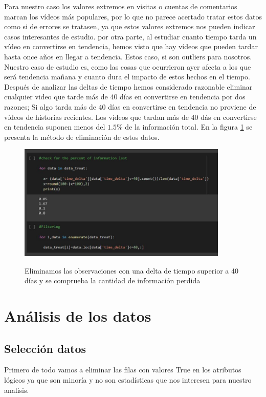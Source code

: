 \documentclass[a4paper,12pt]{article}
\begin{document}
Para nuestro caso los valores extremos en visitas o cuentas de comentarios marcan los v\'ideos m\'as populares, por lo que no parece acertado tratar estos datos como si de errores se tratasen, ya que estos valores extremos nos pueden indicar casos interesantes de estudio. por otra parte, al estudiar cuanto tiempo tarda un v\'ideo en convertirse  en tendencia, hemos visto que hay v\'ideos que pueden tardar hasta once a\~nos en llegar a tendencia. Estos caso, si son outliers  para nosotros. Nuestro caso de estudio es, como las cosas que ocurrieron ayer afecta a los que ser\'a tendencia ma\~nana y cuanto dura el impacto de estos hechos en el tiempo. Despu\'es de analizar las deltas de tiempo hemos considerado razonable eliminar cualquier video que tarde m\'as de 40 d\'ias en convertirse en tendencia por dos razones; Si algo tarda m\'as de 40 d\'ias en convertirse en tendencia no proviene de v\'ideos de historias recientes. Los v\'ideos que tardan m\'as de 40 d\'as en convertirse en tendencia suponen menos del $1.5\%$ de la informaci\'on total. En la figura \ref{fig:delta} se presenta la m\'etodo de eliminaci\'on de estos datos.

\begin{figure}[h!]
\centering
\includegraphics[width=10cm]{tiempo.JPG}\\
\caption{Eliminamos las observaciones con una delta de tiempo superior a 40 d\'ias y se comprueba la cantidad de informaci\'on perdida}
\label{fig:delta}
\end{figure}

\section{An\'alisis de los datos}

\subsection{Selecci\'on datos}
Primero de todo vamos a eliminar las filas con valores True en los atributos l\'ogicos ya que son minor\'ia y no son estad\'isticas que nos interesen para nuestro analisis.
\end{document}
